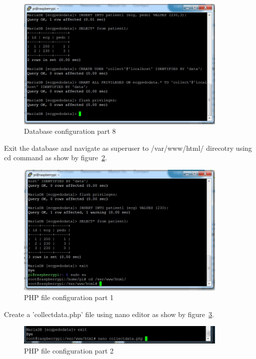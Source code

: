 \documentclass[12pt,]{article}
\begin{document}
\begin{figure}[H]
  	\begin{center}
    	\includegraphics[width=0.9\textwidth]{Ras_33}
  	\end{center}
  	\caption{Database configuration part 8}
	\label{fig:49}
\end{figure}
Exit the database and navigate as superuser to /var/www/html/ direcotry using cd command as show by figure~\ref{fig:50}.
\begin{figure}[H]
  	\begin{center}
    	\includegraphics[width=0.9\textwidth]{Ras_34}
  	\end{center}
  	\caption{PHP file configuration part 1}
	\label{fig:50}
\end{figure}
Create a 'collectdata.php' file using nano editor as show by figure~\ref{fig:51}.
\begin{figure}[H]
  	\begin{center}
    	\includegraphics[width=0.9\textwidth]{Ras_35}
  	\end{center}
  	\caption{PHP file configuration part 2}
	\label{fig:51}
\end{figure}
\end{document}
